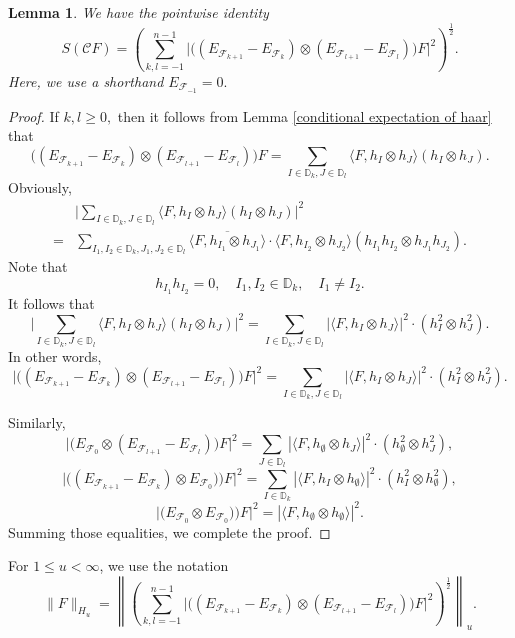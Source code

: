 \documentclass{amsart}
\numberwithin{equation}{section}
\newtheorem{lem}[thm]{Lemma}
\theoremstyle{definition}
\theoremstyle{remark}
\newcommand{\1}{\mathbf 1}
\begin{document}
\begin{lem}\label{s7 pointwise equality} We have the pointwise identity
\begin{equation*}
S(\mathcal{C}F)=\left(\sum_{k,l=-1}^{n-1}\Big|\Big((E_{\mathcal{F}_{k+1}}-E_{\mathcal{F}_k})\otimes(E_{\mathcal{F}_{l+1}}-E_{\mathcal{F}_l})\Big)F\Big|^2\right)^{\frac12}.
\end{equation*}
Here, we use a shorthand $E_{\mathcal{F}_{-1}}=0.$
\end{lem}
\begin{proof} If $k,l\geq0,$ then it follows from Lemma \ref{conditional expectation of haar} that
$$\Big((E_{\mathcal{F}_{k+1}}-E_{\mathcal{F}_k})\otimes(E_{\mathcal{F}_{l+1}}-E_{\mathcal{F}_l})\Big)F=\sum_{I\in\mathbb{D}_k,J\in\mathbb{D}_l}\langle F,h_I\otimes h_J\rangle (h_I\otimes h_J).$$
Obviously,
\begin{align*}
&\Big|\sum_{I\in\mathbb{D}_k,J\in\mathbb{D}_l}\langle F,h_I\otimes h_J\rangle (h_I\otimes h_J)\Big|^2\\
=& \sum_{I_1,I_2\in\mathbb{D}_k,J_1,J_2\in\mathbb{D}_l}\overline{\langle F,h_{I_1}\otimes h_{J_1}\rangle}\cdot \langle F,h_{I_2}\otimes h_{J_2}\rangle (h_{I_1}h_{I_2}\otimes h_{J_1}h_{J_2}).
\end{align*}
Note that
$$h_{I_1}h_{I_2}=0,\quad I_1,I_2\in\mathbb{D}_k,\quad I_1\neq I_2.$$
It follows that
$$\Big|\sum_{I\in\mathbb{D}_k,J\in\mathbb{D}_l}\langle F,h_I\otimes h_J\rangle (h_I\otimes h_J)\Big|^2=\sum_{I\in\mathbb{D}_k,J\in\mathbb{D}_l}|\langle F,h_I\otimes h_J\rangle|^2\cdot (h_I^2\otimes h_J^2).$$
In other words,
$$\Big|\Big((E_{\mathcal{F}_{k+1}}-E_{\mathcal{F}_k})\otimes(E_{\mathcal{F}_{l+1}}-E_{\mathcal{F}_l})\Big)F\Big|^2=\sum_{I\in\mathbb{D}_k,J\in\mathbb{D}_l}|\langle F,h_I\otimes h_J\rangle|^2\cdot(h_I^2\otimes h_J^2).$$

Similarly,
$$\Big|\Big(E_{\mathcal{F}_0}\otimes(E_{\mathcal{F}_{l+1}}-E_{\mathcal{F}_l})\Big)F\Big|^2=\sum_{J\in\mathbb{D}_l}|\langle F,h_{\emptyset}\otimes h_J\rangle|^2\cdot (h_{\emptyset}^2\otimes h_J^2),$$
$$\Big|\Big((E_{\mathcal{F}_{k+1}}-E_{\mathcal{F}_k})\otimes E_{\mathcal{F}_0})\Big)F\Big|^2=\sum_{I\in\mathbb{D}_k}|\langle F,h_I\otimes h_{\emptyset}\rangle|^2\cdot (h_I^2\otimes h_{\emptyset}^2),$$
$$\Big|\Big(E_{\mathcal{F}_0}\otimes E_{\mathcal{F}_0})\Big)F\Big|^2=|\langle F,h_{\emptyset}\otimes h_{\emptyset}\rangle|^2.$$
Summing those equalities, we complete the proof.
\end{proof}

For $1\le u<\infty$, we use the notation
$$\|F\|_{H_u}=\left\|\left(\sum_{k,l=-1}^{n-1}\Big|\Big((E_{\mathcal{F}_{k+1}}-E_{\mathcal{F}_k})\otimes(E_{\mathcal{F}_{l+1}}-E_{\mathcal{F}_l})\Big)F\Big|^2\right)^{\frac12}\right\|_u.$$
\end{document}
